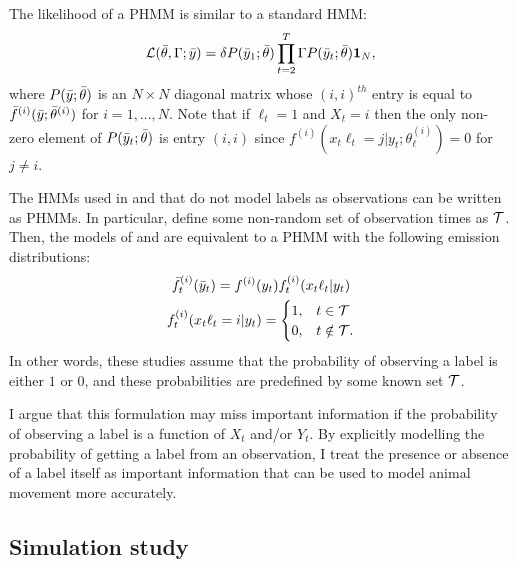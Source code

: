 The likelihood of a PHMM is similar to a standard HMM:
%
\begin{equation}
    \mathcal{L}(\bar{\theta},\Gamma;\bar{y}) = \delta P(\bar{y}_1;\bar{\theta}) \prod_{t=2}^T \Gamma P(\bar{y}_t;\bar{\theta}) \mathbf{1}_N,
    \label{eqn:PHMM_like}
\end{equation}
%
where $P(\bar{y};\bar{\theta})$ is an $N \times N$ diagonal matrix whose $(i,i)^{th}$ entry is equal to $\bar{f}^{(i)}(\bar{y};\bar{\theta}^{(i)})$ for $i = 1,\ldots,N$. Note that if $\ell_t = 1$ and $X_t = i$ then the only non-zero element of $P(\bar{y}_t;\bar{\theta})$ is entry $(i,i)$ since $f^{(i)}(x_t\ell_t = j|y_t;\theta^{(i)}_{\ell}) = 0$ for $j \neq i$.

The HMMs used in \citet{McClintock:2018} and \citet{Li:2021} that do not model labels as observations can be written as PHMMs. In particular, define some non-random set of observation times as $\mathcal{T}$. Then, the models of \citet{McClintock:2018} and \citet{Li:2021} are equivalent to a PHMM with the following emission distributions:
%
\begin{gather}
    \bar{f}_t^{(i)}(\bar{y}_t) = f^{(i)}(y_t) f_t^{(i)}(x_t \ell_t|y_t) \nonumber \\
    f_t^{(i)}(x_t\ell_t = i|y_t) = \begin{cases} 1, & t \in \mathcal{T} \\ 0, & t \notin \mathcal{T}. \end{cases} \label{eqn:PHMM_emis_niave}
\end{gather}
%
In other words, these studies assume that the probability of observing a label is either $1$ or $0$, and these probabilities are predefined by some known set $\mathcal{T}$.

I argue that this formulation may miss important information if the probability of observing a label is a function of $X_t$ and/or $Y_t$. By explicitly modelling the probability of getting a label from an observation, I treat the presence or absence of a label itself as important information that can be used to model animal movement more accurately.

\subsection{Simulation study}

